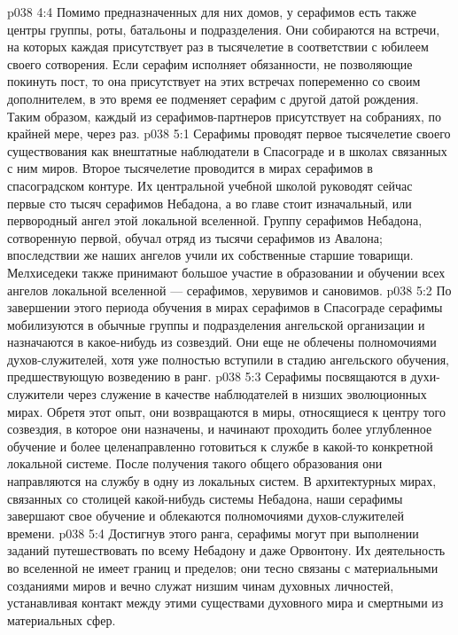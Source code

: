 \vs p038 4:4 Помимо предназначенных для них домов, у серафимов есть также центры группы, роты, батальоны и подразделения. Они собираются на встречи, на которых каждая присутствует раз в тысячелетие в соответствии с юбилеем своего сотворения. Если серафим исполняет обязанности, не позволяющие покинуть пост, то она присутствует на этих встречах попеременно со своим дополнителем, в это время ее подменяет серафим с другой датой рождения. Таким образом, каждый из серафимов\hyp{}партнеров присутствует на собраниях, по крайней мере, через раз.
\vs p038 5:1 Серафимы проводят первое тысячелетие своего существования как внештатные наблюдатели в Спасограде и в школах связанных с ним миров. Второе тысячелетие проводится в мирах серафимов в спасоградском контуре. Их центральной учебной школой руководят сейчас первые сто тысяч серафимов Небадона, а во главе стоит изначальный, или первородный ангел этой локальной вселенной. Группу серафимов Небадона, сотворенную первой, обучал отряд из тысячи серафимов из Авалона; впоследствии же наших ангелов учили их собственные старшие товарищи. Мелхиседеки также принимают большое участие в образовании и обучении всех ангелов локальной вселенной --- серафимов, херувимов и сановимов.
\vs p038 5:2 По завершении этого периода обучения в мирах серафимов в Спасограде серафимы мобилизуются в обычные группы и подразделения ангельской организации и назначаются в какое\hyp{}нибудь из созвездий. Они еще не облечены полномочиями духов\hyp{}служителей, хотя уже полностью вступили в стадию ангельского обучения, предшествующую возведению в ранг.
\vs p038 5:3 Серафимы посвящаются в духи\hyp{}служители через служение в качестве наблюдателей в низших эволюционных мирах. Обретя этот опыт, они возвращаются в миры, относящиеся к центру того созвездия, в которое они назначены, и начинают проходить более углубленное обучение и более целенаправленно готовиться к службе в какой\hyp{}то конкретной локальной системе. После получения такого общего образования они направляются на службу в одну из локальных систем. В архитектурных мирах, связанных со столицей какой\hyp{}нибудь системы Небадона, наши серафимы завершают свое обучение и облекаются полномочиями духов\hyp{}служителей времени.
\vs p038 5:4 Достигнув этого ранга, серафимы могут при выполнении заданий путешествовать по всему Небадону и даже Орвонтону. Их деятельность во вселенной не имеет границ и пределов; они тесно связаны с материальными созданиями миров и вечно служат низшим чинам духовных личностей, устанавливая контакт между этими существами духовного мира и смертными из материальных сфер.
